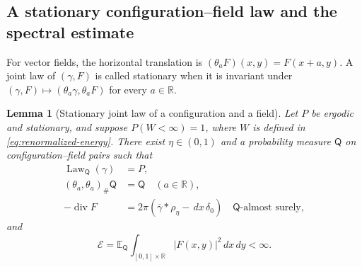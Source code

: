 \documentclass[11pt,reqno]{amsart}
\numberwithin{equation}{section}
\newtheorem{lemma}[theorem]{Lemma}
\theoremstyle{definition}
\theoremstyle{remark}
\newcommand{\R}{\mathbb R}
\newcommand{\E}{\mathbb E}
\newcommand{\1}{\mathbf 1}
\DeclareMathOperator{\Law}{Law}
\newcommand{\dd}{\,d}
\newcommand{\calE}{\mathcal E}
\DeclareMathOperator{\diver}{div}
\begin{document}
\subsection{A stationary configuration--field law and the spectral estimate}


For vector fields, the horizontal translation is
$(\theta_aF)(x,y)=F(x+a,y)$. A joint law of $(\gamma,F)$ is called
stationary when it is invariant under
$(\gamma,F)\mapsto(\theta_a\gamma,\theta_aF)$ for every $a\in\R$.

\begin{samepage}
\begin{lemma}[Stationary joint law of a configuration and a field]\label{lem:lift}
Let $P$ be ergodic and stationary, and suppose
$P(W<\infty)=1$, where $W$ is defined in
\eqref{eq:renormalized-energy}. There exist $\eta\in(0,1)$ and a
probability measure $\mathsf Q$ on configuration--field pairs such that
\begin{equation}\label{eq:joint-law-properties}
\begin{aligned}
\Law_{\mathsf Q}(\gamma)&=P,\\
(\theta_a,\theta_a)_\#\mathsf Q&=\mathsf Q\quad(a\in\R),\\
-\diver F&=2\pi(\overline\gamma*\rho_\eta-\dd x\,\delta_0)
\quad\mathsf Q\text{-almost surely},
\end{aligned}
\end{equation}
and
\begin{equation}\label{eq:field-energy}
\calE=\E_{\mathsf Q}\int_{[0,1]\times\R}|F(x,y)|^2\dd x\dd y<\infty.
\end{equation}
\end{lemma}
\end{samepage}
\end{document}
